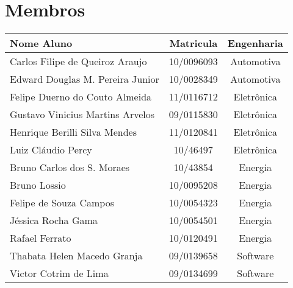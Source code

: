 \chapter*{Membros}
\begin{table}[ht!]
\centering
\label{tab:membros}
\begin{tabular}{|l|c|c|}
Nome Aluno                       & Matricula  & Engenharia \\
\hline
Carlos Filipe de Queiroz Araujo  & 10/0096093 & Automotiva \\
Edward Douglas M. Pereira Junior & 10/0028349 & Automotiva \\
\hline
Felipe Duerno do Couto Almeida   & 11/0116712 & Eletrônica \\
Gustavo Vinicius Martins Arvelos & 09/0115830 & Eletrônica \\
Henrique Berilli Silva Mendes    & 11/0120841 & Eletrônica \\
Luiz Cláudio Percy               & 10/46497   & Eletrônica \\
\hline
Bruno Carlos dos S. Moraes       & 10/43854        & Energia    \\
Bruno Lossio                     & 10/0095208 & Energia    \\
Felipe de Souza Campos           & 10/0054323 & Energia    \\
Jéssica Rocha Gama               & 10/0054501 & Energia    \\
Rafael Ferrato                   & 10/0120491 & Energia    \\
\hline
Thabata Helen Macedo Granja      & 09/0139658 & Software   \\
Victor Cotrim de Lima            & 09/0134699 & Software   \\ \hline
\end{tabular}
\end{table}
